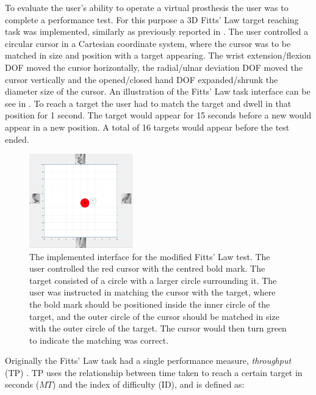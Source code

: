 To evaluate the user's ability to operate a virtual prosthesis the user was to complete a performance test. For this purpose a 3D Fitts' Law target reaching task was implemented, similarly as previously reported in \cite{Scheme2013, Scheme2013a}. The user controlled a circular cursor in a Cartesian coordinate system, where the cursor was to be matched in size and position with a target appearing. The wrist extension/flexion DOF moved the cursor horizontally, the radial/ulnar deviation DOF moved the cursor vertically and the opened/closed hand DOF expanded/shrunk the diameter size of the cursor. An illustration of the Fitts' Law task interface can be see in . To reach a target the user had to match the target and dwell in that position for 1 second. The target would appear for 15 seconds before a new would appear in a new position. A total of 16 targets would appear before the test ended. \\

\begin{figure}[H] 
	\includegraphics[width=0.4\textwidth]{figures/Paper/perftestGUI}
	\caption{The implemented interface for the modified Fitts' Law test. The user controlled the red cursor with the centred bold mark. The target consisted of a circle with a larger circle surrounding it. The user was instructed in matching the cursor with the target, where the bold mark should be positioned inside the inner circle of the target, and the outer circle of the cursor should be matched in size with the outer circle of the target. The cursor would then turn green to indicate the matching was correct.}
	\label{fig:fittsLawTask}
\end{figure}

Originally the Fitts' Law task had a single performance measure, \textit{throughput} (TP) \cite{Fitts1954}. TP uses the relationship between time taken to reach a certain target in seconds ($MT$) and the index of difficulty (ID), and is defined as:

